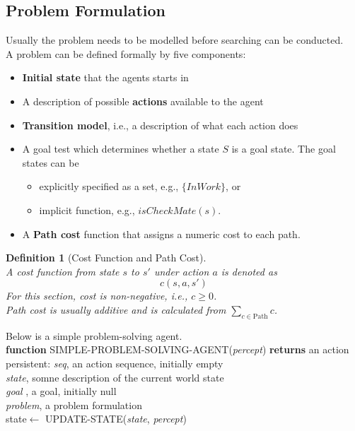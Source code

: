 \documentclass[12pt]{article}
\newcommand{\ind}{\hspace*{15pt}}
\newtheorem{definition}{Definition}[section]
\theoremstyle{definition}
\begin{document}
\subsection{Problem Formulation}
Usually the problem needs to be modelled before searching can be conducted. \\ 
A problem can be defined formally by five components:
\begin{itemize}
	\item \textbf{Initial state} that the agents starts in
	\item A description of possible \textbf{actions} available to the agent
	\item \textbf{Transition model}, i.e., a description of what each action does 
	\item A goal test which determines whether a state $S$ is a goal state. The goal states can be
\begin{itemize}
	\item explicitly specified as a set, e.g., $\{InWork\}$, or
	\item implicit function, e.g., $isCheckMate(s)$.
\end{itemize}
\item A \textbf{Path cost} function that assigns a numeric cost to each path.
\end{itemize}
\begin{definition}[Cost Function and Path Cost]
\hfill\\\normalfont A cost function from state $s$ to $s'$ under action $a$ is denoted as
\[
c(s, a, s')
\]
For this section, cost is non-negative, i.e., $c\geq 0$.\\
Path cost is usually additive and is calculated from $\sum_{c\in \text{Path}}c$.
\end{definition}
Below is a simple problem-solving agent.\\
\textbf{function} \textsc{SIMPLE-PROBLEM-SOLVING-AGENT}(\textit{percept}) \textbf{returns} an action\\
\ind persistent: \textit{seq}, an action sequence, initially empty\\
\ind\ind\ind\ind \textit{state}, somne description of the current world state\\
\ind\ind\ind\ind \textit{goal} , a goal, initially null\\
\ind\ind\ind\ind \textit{problem}, a problem formulation\\
\ind state$\leftarrow$ \textsc{UPDATE-STATE}(\textit{state}, \textit{percept})\\
\end{document}

